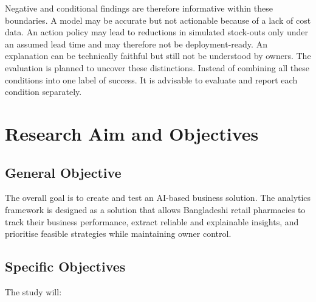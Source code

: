 \documentclass[a4paper,11pt,oneside]{book}
\theoremstyle{plain}
\theoremstyle{definition}
\theoremstyle{remark}
\begin{document}
Negative and conditional findings are therefore informative within these boundaries. A model may be accurate but not actionable because of a lack of cost data. An action policy may lead to reductions in simulated stock-outs only under an assumed lead time and may therefore not be deployment-ready. An explanation can be technically faithful but still not be understood by owners. The evaluation is planned to uncover these distinctions. Instead of combining all these conditions into one label of success. It is advisable to evaluate and report each condition separately.


\section{Research Aim and Objectives}

\subsection{General Objective}

The overall goal is to create and test an AI-based business solution. The analytics framework is designed as a solution that allows Bangladeshi retail pharmacies to track their business performance, extract reliable and explainable insights, and prioritise feasible strategies while maintaining owner control.


\subsection{Specific Objectives}

The study will:
\end{document}
